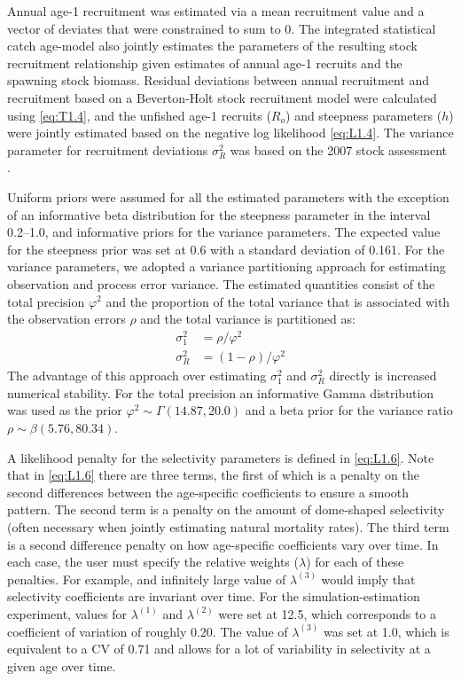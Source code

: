 Annual age-1 recruitment was estimated via a mean recruitment value and a vector of deviates that were constrained to sum to 0.  The integrated statistical catch age-model also jointly estimates the parameters of the resulting stock recruitment relationship given estimates of annual age-1 recruits and the  spawning stock biomass.  Residual deviations between annual recruitment and recruitment based on a Beverton-Holt stock recruitment model were calculated using \eqref{eq:T1.4}, and the unfished age-1 recruits ($R_o$) and steepness parameters ($h$) were jointly estimated based on the negative log likelihood \eqref{eq:L1.4}.  The variance parameter for recruitment deviations $\sigma_R^2$ was based on the 2007 stock assessment \citep{helser2007stock}.

Uniform priors were assumed for all the estimated parameters with the exception of an informative beta distribution for the steepness parameter in the interval 0.2--1.0, and informative priors for the variance parameters.  The expected value for the steepness prior was set at 0.6 with a standard deviation of 0.161.  For the variance parameters, we adopted a variance partitioning approach for estimating observation and process error variance. The estimated quantities consist of the total precision $\varphi^2$ and the proportion of the total variance that is associated with the observation errors $\rho$ and the total variance is partitioned as:  
\begin{align}
	\sigma^2_1 &= \rho/\varphi^2 \nonumber \\
	\sigma^2_R   &= (1-\rho)/\varphi^2 \label{eq:variance}
\end{align}
The advantage of this approach over estimating $\sigma_1^2$ and $\sigma_R^2$ directly is increased numerical stability.  For the total precision an informative Gamma distribution was used as the prior $\varphi^2 \sim \Gamma(14.87,20.0)$ and a beta prior for the variance ratio $\rho \sim \beta(5.76,80.34)$. 

A likelihood penalty for the selectivity parameters is defined in \eqref{eq:L1.6}.  Note that in \eqref{eq:L1.6} there are three terms, the first of which is a penalty on the second differences between the age-specific coefficients to ensure a smooth pattern.  The second term is a penalty on the amount of dome-shaped selectivity (often necessary when jointly estimating natural mortality rates).  The third term is a second difference penalty on how age-specific coefficients vary over time.  In each case, the user must specify the relative weights ($\lambda$) for each of these penalties.   For example, and infinitely large value of $\lambda^{(3)}$ would imply that selectivity coefficients are invariant over time.  For the simulation-estimation experiment, values for $\lambda^{(1)}$ and $\lambda^{(2)}$ were set at 12.5, which corresponds to a coefficient of variation of roughly 0.20.  The value of $\lambda^{(3)}$ was set at 1.0, which is equivalent to a CV of 0.71 and allows for a lot of variability in selectivity at a given age over time.


